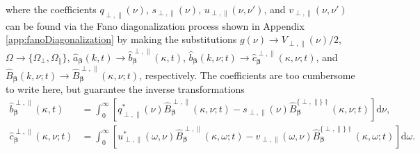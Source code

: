\documentclass{article}
\begin{document}
where the coefficients $q_{\perp,\parallel}(\nu)$, $s_{\perp,\parallel}(\nu)$, $u_{\perp,\parallel}(\nu,\nu')$, and $v_{\perp,\parallel}(\nu,\nu')$ can be found via the Fano diagonalization process shown in Appendix \ref{app:fanoDiagonalization} by making the substitutions $g(\nu)\to V_{\perp,\parallel}(\nu)/2$, $\Omega\to\{\Omega_\perp,\Omega_\parallel\}$, $\hat{a}_{\bm{\beta}}(k,t)\to\hat{b}_{\bm{\beta}}^{\perp,\parallel}(\kappa,t)$, $\hat{b}_{\bm{\beta}}(k,\nu;t)\to\hat{c}_{\bm{\beta}}^{\perp,\parallel}(\kappa,\nu;t)$, and $\hat{B}_{\bm{\beta}}(k,\nu;t)\to\hat{B}_{\bm{\beta}}^{\perp,\parallel}(\kappa,\nu;t)$, respectively. The coefficients are too cumbersome to write here, but guarantee the inverse transformations
\begin{equation}
\begin{split}
\hat{b}_{\bm{\beta}}^{\perp,\parallel}(\kappa,t) &= \int_0^\infty\left[q_{\perp,\parallel}^*(\nu)\hat{B}_{\bm{\beta}}^{\perp,\parallel}(\kappa,\nu;t) - s_{\perp,\parallel}(\nu)\hat{B}_{\bm{\beta}}^{\{\perp,\parallel\}\dagger}(\kappa,\nu;t)\right]\mathrm{d}\nu,\\
\hat{c}_{\bm{\beta}}^{\perp,\parallel}(\kappa,\nu;t) &= \int_0^\infty\left[u_{\perp,\parallel}^*(\omega,\nu)\hat{B}_{\bm{\beta}}^{\perp,\parallel}(\kappa,\omega;t) - v_{\perp,\parallel}(\omega,\nu)\hat{B}_{\bm{\beta}}^{\{\perp,\parallel\}\dagger}(\kappa,\omega;t)\right]\mathrm{d}\omega.
\end{split}
\end{equation}
\end{document}
